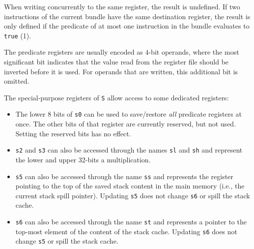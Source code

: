 \documentclass[a4paper,fontsize=10pt,twoside,DIV15,BCOR12mm,headinclude=true,footinclude=false,pagesize,bibtotoc]{scrbook}
\newcommand{\comment}[3]{

\textsf{\textbf{#1}} {\color{#3}#2}}
\newcommand{\wolf}[1]{\comment{Wolfgang}{#1}{OliveGreen}}
\newcommand{\stefan}[1]{\comment{Stefan}{#1}{RoyalPurple}}
\renewcommand{\wolf}[1]{}
\renewcommand{\stefan}[1]{}
\begin{document}
When writing concurrently to the same register, the result is
undefined. If two instructions of the current bundle have the same
destination register, the result is only defined if the predicate of
at most one instruction in the bundle evaluates to \texttt{true} (1).

\wolf{In practice, the result is even defined if both instructions
  write to the same register, but I would not make this a feature of
  the ISA.}

The predicate registers are usually encoded as $4$-bit operands, where the most
significant bit indicates that the value read from the register file should be
inverted before it is used. For operands that are written, this additional bit
is omitted.

The special-purpose registers of \texttt{S} allow access to some dedicated
registers:
\begin{itemize}
  \item The lower $8$ bits of \texttt{s0} can be used to save/restore
    \emph{all} predicate registers at once. The other bits of that
    register are currently reserved, but not used. Setting the reserved
	bits has no effect.
  \item \texttt{s2} and \texttt{s3} can also be accessed through the names
    \texttt{sl} and \texttt{sh} and represent the lower and upper
    32-bits a multiplication.
  \item \texttt{s5} can also be accessed through the name \texttt{ss} and
    represents the register pointing to the top of the saved stack
	content in the main memory (i.e., the current stack spill pointer).
	Updating \texttt{s5} does not change \texttt{s6} or spill the stack cache.
  \item \texttt{s6} can also be accessed through the name \texttt{st} and
    represents a pointer to the top-most element of the content of the
    stack cache.
	Updating \texttt{s6} does not change \texttt{s5} or spill the stack cache.
\end{itemize}

\stefan{None of the registers should be read-only, as they need to be restored when
we switch contexts.}
\end{document}
